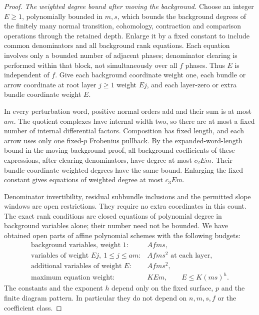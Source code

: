 \begin{proof}
\emph{The weighted degree bound after moving the background.}
Choose an integer $E\geq1$, polynomially bounded in $m,s$,
which bounds the background degrees of the finitely many
normal transition, cohomology, contraction and comparison
operations through the retained depth. Enlarge it by a
fixed constant to include common denominators and all
background rank equations. Each equation involves only a
bounded number of adjacent phases; denominator clearing
is performed within that block, not simultaneously over
all $f$ phases. Thus $E$ is independent of $f$.
Give each background coordinate
weight one, each bundle or arrow coordinate at root layer
$j\geq1$ weight $Ej$, and each layer-zero or extra bundle
coordinate weight $E$.

In every perturbation word, positive normal orders add
and their sum is at most $am$. The quotient complexes have
internal width two, so there are at most a fixed number of
internal differential factors. Composition has fixed length,
and each arrow uses only one fixed-$p$ Frobenius pullback.
By the expanded-word-length bound in the moving-background
proof, all background coefficients of these expressions,
after clearing denominators, have degree at most $c_2Em$.
Their bundle-coordinate weighted degrees have the same
bound. Enlarging the fixed constant gives equations of
weighted degree at most $c_3Em$.

Denominator invertibility, residual subbundle inclusions
and the permitted slope windows are open restrictions.
They require no extra coordinates in this count. The exact
rank conditions are closed equations of polynomial degree
in background variables alone; their number need not be
bounded. We have obtained open parts of affine polynomial
schemes with the following budgets:
\[
 \begin{array}{ll}
 \text{background variables, weight }1:& A fms,\\
 \text{variables of weight }Ej,\ 1\leq j\leq am:& A fms^2
                  \text{ at each layer},\\
 \text{additional variables of weight }E:& A fms^2,\\
 \text{maximum equation weight}:& KEm,
       \qquad E\leq K(ms)^h.
 \end{array}                                             \tag{D.UP.4}
\]
The constants and the exponent $h$ depend only on the fixed
surface, $p$ and the finite diagram pattern. In particular
they do not depend on $n,m,s,f$ or the coefficient class.


\end{proof}
